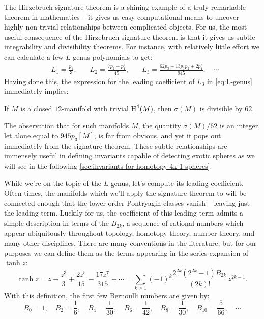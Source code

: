 The Hirzebruch signature theorem is a shining example of a truly remarkable theorem in mathematics -- it gives us easy computational means to uncover highly non-trivial relationships between complicated objects. For us, the most useful consequence of the Hirzebruch signature theorem is that it gives us subtle integrability and divisibility theorems. For instance, with relatively little effort we can calculate a few $L$-genus polynomials to get:
\begin{equation}\label{eq:L-genus}
	\begin{aligned}
		 & L_1 = \frac{p_1}{3},\quad
		 & L_2 = \frac{7p_2 - p_1^2}{45},\quad
		 & L_3 = \frac{62p_3 - 13p_1p_2 + 2p_1^3}{945},\quad\cdots
	\end{aligned}
\end{equation}
Having done this, the expression for the leading coefficient of $L_3$ in \cref{eq:L-genus} immediately implies:
\begin{corollary}
	If $M$ is a closed $12$-manifold with trivial $\operatorname{H}^4(M)$, then $\sigma(M)$ is divisible by $62$.
\end{corollary}
The observation that for such manifolds $M$, the quantity $\sigma(M)/62$ is an integer, let alone equal to $945p_3[M]$, is far from obvious, and yet it pops out immediately from the signature theorem. These subtle relationships are immensely useful in defining invariants capable of detecting exotic spheres as we will see in the following \cref{sec:invariants-for-homotopy-4k-1-spheres}.

While we're on the topic of the $L$-genus, let's compute its leading coefficient. Often times, the manifolds which we'll apply the signature theorem to will be connected enough that the lower order Pontryagin classes vanish -- leaving just the leading term.
Luckily for us, the coefficient of this leading term admits a simple description in terms of the  $B_{2k}$, a sequence of rational numbers which appear ubiquitously throughout topology, homotopy theory, number theory, and many other disciplines. There are many conventions in the literature, but for our purposes we can define them as the terms appearing in the series expansion of $\tanh z$:
\begin{equation}\label{eq:tanh_series}
	\tanh z = z - \frac{z^3}{3} + \frac{2z^5}{15} - \frac{17z^7}{315}+\cdots = \sum_{k\geq 1} (-1)^k\frac{2^{2k}(2^{2k}-1)B_{2k}}{(2k)!}\, z^{2k-1}.
\end{equation}
With this definition, the first few Bernoulli numbers are given by:
\begin{equation}\label{eq:bernoulli_numbers}
	B_0 = 1,\quad B_2 = \frac{1}{6},\quad B_4 = \frac{1}{30},\quad B_6=\frac{1}{42},\quad B_{8}=\frac{1}{30},\quad B_{10} = \frac{5}{66},\quad\cdots
\end{equation}

